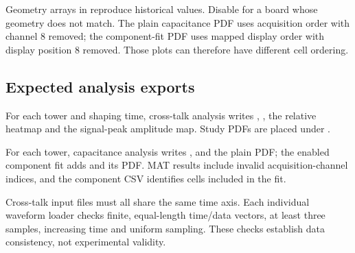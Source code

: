 Geometry arrays in  reproduce historical values. Disable  for a board whose geometry does not match. The plain capacitance PDF uses acquisition order with channel 8 removed; the component-fit PDF uses mapped display order with display position 8 removed. Those plots can therefore have different cell ordering.

\subsection{Expected analysis exports}
For each tower and shaping time, cross-talk analysis writes , , the relative heatmap and the signal-peak amplitude map. Study PDFs are placed under .

For each tower, capacitance analysis writes ,  and the plain PDF; the enabled component fit adds  and its PDF. MAT results include invalid acquisition-channel indices, and the component CSV identifies cells included in the fit.

Cross-talk input files must all share the same time axis. Each individual waveform loader checks finite, equal-length time/data vectors, at least three samples, increasing time and uniform sampling. These checks establish data consistency, not experimental validity.
